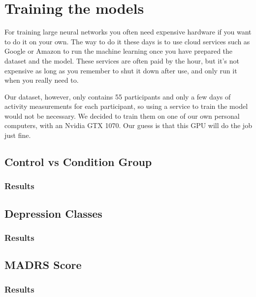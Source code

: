 
\section{Training the models}

For training large neural networks you often need expensive hardware if you want to do it on your own. 
The way to do it these days is to use cloud services such as Google or Amazon to run the machine learning once you have prepared the dataset and the model. 
These services are often paid by the hour, but it's not expensive as long as you remember to shut it down after use, and only run it when you really need to.

Our dataset, however, only contains 55 participants and only a few days of activity measurements for each participant, 
so using a service to train the model would not be necessary. We decided to train them on one of our own personal computers, 
with an Nvidia GTX 1070. Our guess is that this GPU will do the job just fine. 


\subsection{Control vs Condition Group}
\subsubsection{Results}

\subsection{Depression Classes}
\subsubsection{Results}

\subsection{MADRS Score}
\subsubsection{Results}